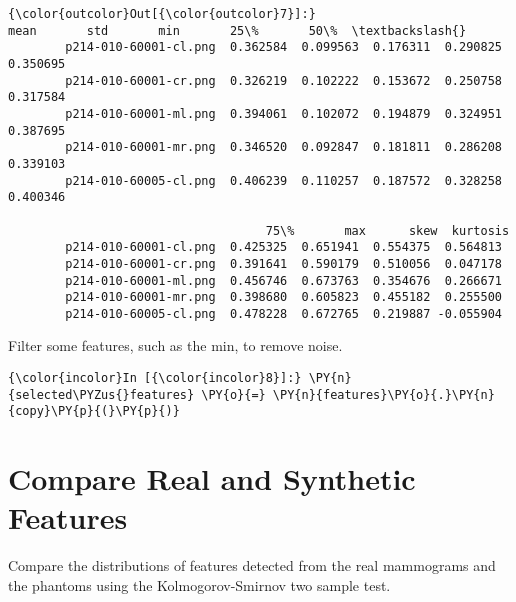             \begin{Verbatim}[commandchars=\\\{\}]
{\color{outcolor}Out[{\color{outcolor}7}]:}                            mean       std       min       25\%       50\%  \textbackslash{}
        p214-010-60001-cl.png  0.362584  0.099563  0.176311  0.290825  0.350695
        p214-010-60001-cr.png  0.326219  0.102222  0.153672  0.250758  0.317584
        p214-010-60001-ml.png  0.394061  0.102072  0.194879  0.324951  0.387695
        p214-010-60001-mr.png  0.346520  0.092847  0.181811  0.286208  0.339103
        p214-010-60005-cl.png  0.406239  0.110257  0.187572  0.328258  0.400346

                                    75\%       max      skew  kurtosis
        p214-010-60001-cl.png  0.425325  0.651941  0.554375  0.564813
        p214-010-60001-cr.png  0.391641  0.590179  0.510056  0.047178
        p214-010-60001-ml.png  0.456746  0.673763  0.354676  0.266671
        p214-010-60001-mr.png  0.398680  0.605823  0.455182  0.255500
        p214-010-60005-cl.png  0.478228  0.672765  0.219887 -0.055904
\end{Verbatim}

    Filter some features, such as the min, to remove noise.

    \begin{Verbatim}[commandchars=\\\{\}]
{\color{incolor}In [{\color{incolor}8}]:} \PY{n}{selected\PYZus{}features} \PY{o}{=} \PY{n}{features}\PY{o}{.}\PY{n}{copy}\PY{p}{(}\PY{p}{)}
\end{Verbatim}

    \section{Compare Real and Synthetic
Features}\label{compare-real-and-synthetic-features}

    Compare the distributions of features detected from the real mammograms
and the phantoms using the Kolmogorov-Smirnov two sample test.


